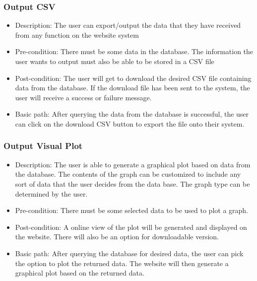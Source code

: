 \documentclass[12pt]{article}
\begin{document}
\subsubsection{Output CSV}
\begin{itemize}
  \item Description: The user can export/output the data that they have received
  from any function on the website system
  \item Pre-condition: There must be some data in the database. The information
  the user wants to output must also be able to be stored in a CSV file 
  \item Post-condition: The user will get to download the desired CSV file
  containing data from the database. If the download file has been sent to the
  system, the user will receive a success or failure message.
  \item Basic path: After querying the data from the database is successful, the
  user can click on the download CSV button to export the file onto their system.
\end{itemize}

\subsubsection{Output Visual Plot}
\begin{itemize}
  \item Description: The user is able to generate a graphical plot based on data
  from the database. The contents of the graph can be customized to include any
  sort of data that the user decides from the data base. The graph type can be determined by the user. 
  \item Pre-condition: There must be some selected data to be used to plot a graph.
  \item Post-condition: A online view of the plot will be generated and
  displayed on the website. There will also be an option for downloadable version. 
  \item Basic path: After querying the database for desired data, the user can
  pick the option to plot the returned data. The website will then generate a
  graphical plot based on the returned data.
\end{itemize}
\end{document}
